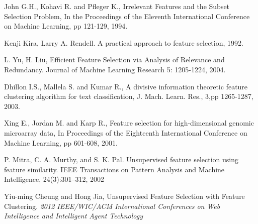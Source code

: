 \documentclass[a4paper,11pt]{article}
\begin{document}
\begin{thebibliography}{}
John G.H., Kohavi R. and Pfleger K., Irrelevant Features and the Subset Selection Problem, In the Proceedings of the Eleventh International Conference on Machine Learning, pp 121-129, 1994.

Kenji Kira, Larry A. Rendell. A practical approach to feature selection, 1992.

L. Yu, H. Liu, Efficient Feature Selection via Analysis
of Relevance and Redundancy. Journal of Machine
Learning Research 5: 1205-1224, 2004.

Dhillon I.S., Mallela S. and Kumar R., A divisive information theoretic feature clustering algorithm for text classification, J. Mach. Learn. Res., 3,pp 1265-1287, 2003.

Xing E., Jordan M. and Karp R., Feature selection for high-dimensional genomic microarray data, In Proceedings of the Eighteenth International Conference on Machine Learning, pp 601-608, 2001.

P. Mitra, C. A. Murthy, and S. K. Pal. Unsupervised feature selection using feature similarity. IEEE Transactions on Pattern Analysis and Machine Intelligence, 24(3):301–312, 2002

Yiu-ming Cheung and Hong Jia, Unsupervised Feature Selection with Feature Clustering. \textit{2012 IEEE/WIC/ACM International Conferences on Web Intelligence and Intelligent Agent Technology}

\end{thebibliography}
\end{document}
